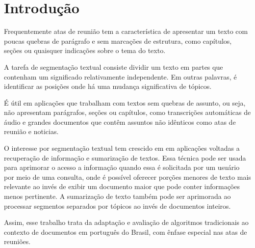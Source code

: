 

\section{Introdução}
	\label{sec:introducao}



Frequentemente atas de reunião tem a característica de apresentar um texto com poucas quebras de parágrafo e sem marcações de estrutura, como capítulos, seções ou quaisquer indicações sobre o tema do texto. 



A tarefa de segmentação textual consiste dividir um texto em partes que contenham um significado relativamente independente. Em outras palavras, é identificar as posições onde há uma mudança significativa de tópicos.

É útil em aplicações que trabalham com textos sem quebras de assunto, ou seja, não apresentam parágrafos, seções ou capítulos, como transcrições automáticas de áudio e grandes documentos que contêm assuntos não idênticos como atas de reunião e noticias.


O interesse por segmentação textual tem crescido em em aplicações voltadas a recuperação de informação %
e sumarização de textos. %
Essa técnica pode ser usada para aprimorar o acesso a informação quando essa é solicitada por um usuário por meio de uma consulta, onde é possível oferecer porções menores de texto mais relevante ao invés de exibir um documento maior que pode conter informações menos pertinente. A sumarização de texto também pode ser aprimorada ao processar segmentos separados por tópicos ao invés de documentos inteiros.


Assim, esse trabalho trata da adaptação e avaliação de algoritmos tradicionais ao contexto de documentos em português do Brasil, com ênfase especial nas atas de reuniões.








